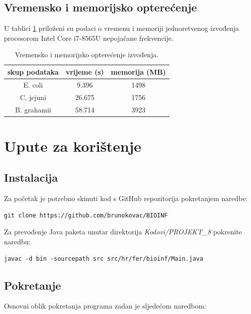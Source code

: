 \documentclass[times, utf8, seminar, numeric]{fer}
\begin{document}
\section{Vremensko i memorijsko opterećenje}

U tablici \ref{table:results} priloženi su podaci o vremenu i memoriji jednoretvenog izvođenja procesorom Intel Core i7-8565U nepojačane frekvencije.

\begin{table}[h]
\begin{center}
\begin{tabular}{|c||c|c|}
	\hline
	skup podataka & vrijeme (s) & memorija (MB)\\
	\hline
	\hline
	E. coli & 9.396 & 1498 \\
	\hline
	C. jejuni & 26.675 & 1756 \\
	\hline
	B. grahamii & 58.714 & 3923 \\
	\hline
\end{tabular}
	\caption{Vremensko i memorijsko opterećenje izvođenja.}
	\label{table:results}
\end{center}
\end{table}

\chapter{Upute za korištenje}

\section{Instalacija}

Za početak je potrebno skinuti kod s GitHub repozitorija pokretanjem naredbe:

\begin{verbatim}
git clone https://github.com/brunokovac/BIOINF
\end{verbatim}

Za prevođenje Java paketa unutar direktorija \textit{Kodovi/PROJEKT\_8} pokrenite naredbu:

\begin{verbatim}
javac -d bin -sourcepath src src/hr/fer/bioinf/Main.java
\end{verbatim}

\section{Pokretanje}

Osnovni oblik pokretanja programa zadan je sljedećom naredbom:
\end{document}
